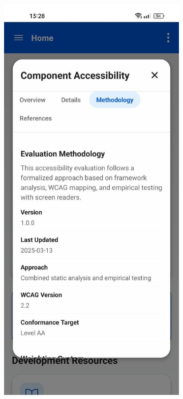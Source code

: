 \begin{figure}[ht]
    \centering
    \begin{subfigure}[b]{0.48\textwidth}
        \centering
        \includegraphics[width=\linewidth]{img/methodology.jpg}

\end{subfigure}
\end{figure}

